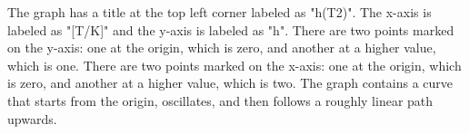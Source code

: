 The graph has a title at the top left corner labeled as "h(T2)". The x-axis is labeled as "[T/K]" and the y-axis is labeled as "h". There are two points marked on the y-axis: one at the origin, which is zero, and another at a higher value, which is one. There are two points marked on the x-axis: one at the origin, which is zero, and another at a higher value, which is two. The graph contains a curve that starts from the origin, oscillates, and then follows a roughly linear path upwards.